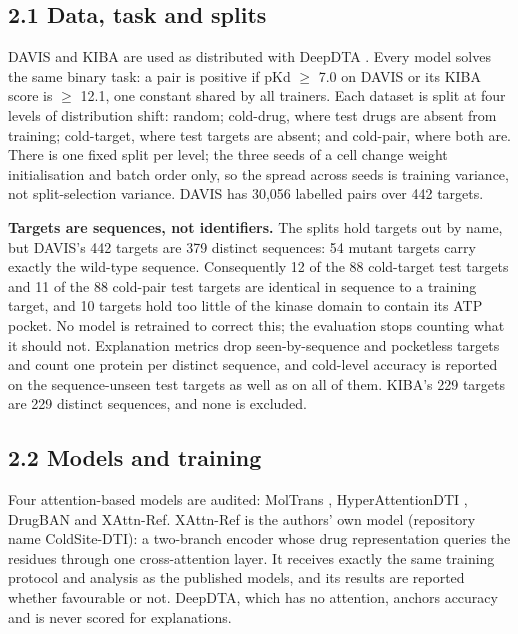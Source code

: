 \subsection{2.1 Data, task and splits}\label{data-task-and-splits}

DAVIS \citep{Davis2011} and KIBA \citep{Tang2014} are used as distributed with DeepDTA \citep{Ozturk2018}. Every model solves the same binary task: a pair is positive if pKd $\geq$ 7.0 on DAVIS or its KIBA score is $\geq$ 12.1, one constant shared by all trainers. Each dataset is split at four levels of distribution shift: random; cold-drug, where test drugs are absent from training; cold-target, where test targets are absent; and cold-pair, where both are. There is one fixed split per level; the three seeds of a cell change weight initialisation and batch order only, so the spread across seeds is training variance, not split-selection variance. DAVIS has 30,056 labelled pairs over 442 targets.

\textbf{Targets are sequences, not identifiers.} The splits hold targets out by name, but DAVIS's 442 targets are 379 distinct sequences: 54 mutant targets carry exactly the wild-type sequence. Consequently 12 of the 88 cold-target test targets and 11 of the 88 cold-pair test targets are identical in sequence to a training target, and 10 targets hold too little of the kinase domain to contain its ATP pocket. No model is retrained to correct this; the evaluation stops counting what it should not. Explanation metrics drop seen-by-sequence and pocketless targets and count one protein per distinct sequence, and cold-level accuracy is reported on the sequence-unseen test targets as well as on all of them. KIBA's 229 targets are 229 distinct sequences, and none is excluded.

\subsection{2.2 Models and training}\label{models-and-training}

Four attention-based models are audited: MolTrans \citep{Huang2021}, HyperAttentionDTI \citep{Zhao2022}, DrugBAN \citep{Bai2023} and XAttn-Ref. XAttn-Ref is the authors' own model (repository name ColdSite-DTI): a two-branch encoder whose drug representation queries the residues through one cross-attention layer. It receives exactly the same training protocol and analysis as the published models, and its results are reported whether favourable or not. DeepDTA, which has no attention, anchors accuracy and is never scored for explanations.

